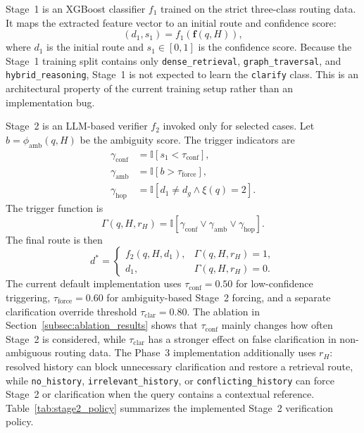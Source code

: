 \documentclass[11pt,twocolumn]{article}
\begin{document}
Stage~1 is an XGBoost classifier $f_1$ trained on the strict
three-class routing data. It maps the extracted feature
vector to an initial route and confidence score:
\begin{equation}
(d_1,s_1)=f_1(\mathbf{f}(q,H)),
\label{eq:stage1_router}
\end{equation}
where $d_1$ is the initial route and $s_1\in[0,1]$ is the
confidence score. Because the Stage~1 training split contains
only \texttt{dense\_retrieval}, \texttt{graph\_traversal},
and \texttt{hybrid\_reasoning}, Stage~1 is not expected to
learn the \texttt{clarify} class. This is an architectural
property of the current training setup rather than an
implementation bug.

Stage~2 is an LLM-based verifier $f_2$ invoked only for
selected cases. Let $b=\phi_{\mathrm{amb}}(q,H)$ be the
ambiguity score. The trigger indicators are
\begin{align}
\gamma_{\mathrm{conf}} &= \mathbb{I}[s_1 < \tau_{\mathrm{conf}}], \\
\gamma_{\mathrm{amb}} &= \mathbb{I}[b > \tau_{\mathrm{force}}], \\
\gamma_{\mathrm{hop}} &= \mathbb{I}[d_1 \neq d_g \wedge \xi(q)=2].
\end{align}
The trigger function is
\begin{equation}
\Gamma(q,H,r_H)=\mathbb{I}[\gamma_{\mathrm{conf}}\vee
\gamma_{\mathrm{amb}}\vee\gamma_{\mathrm{hop}}].
\label{eq:trigger_function}
\end{equation}
The final route is then
\begin{equation}
d^*=\begin{cases}
f_2(q,H,d_1), & \Gamma(q,H,r_H)=1,\\
d_1, & \Gamma(q,H,r_H)=0.
\end{cases}
\label{eq:stage2_router}
\end{equation}
The current default implementation uses
$\tau_{\mathrm{conf}}=0.50$ for low-confidence triggering,
$\tau_{\mathrm{force}}=0.60$ for ambiguity-based Stage~2
forcing, and a separate clarification override threshold
$\tau_{\mathrm{clar}}=0.80$. The ablation in
Section~\ref{subsec:ablation_results} shows that
$\tau_{\mathrm{conf}}$ mainly changes how often Stage~2 is
considered, while $\tau_{\mathrm{clar}}$ has a stronger effect
on false clarification in non-ambiguous routing data.
The Phase~3 implementation additionally uses $r_H$: resolved
history can block unnecessary clarification and restore a
retrieval route, while \texttt{no\_history},
\texttt{irrelevant\_history}, or
\texttt{conflicting\_history} can force Stage~2 or
clarification when the query contains a contextual reference.
Table~\ref{tab:stage2_policy} summarizes the implemented
Stage~2 verification policy.
\end{document}

